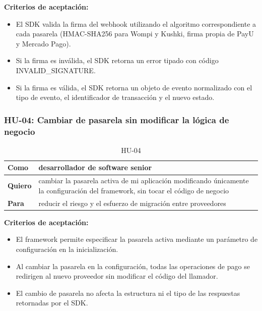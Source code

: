 \documentclass[10pt]{article}
\begin{document}
\textbf{Criterios de aceptación:}
\begin{itemize}
  \item El SDK valida la firma del webhook utilizando el algoritmo correspondiente a cada pasarela (HMAC-SHA256 para Wompi y Kushki, firma propia de PayU y Mercado Pago).
  \item Si la firma es inválida, el SDK retorna un error tipado con código INVALID\_SIGNATURE.
  \item Si la firma es válida, el SDK retorna un objeto de evento normalizado con el tipo de evento, el identificador de transacción y el nuevo estado.
\end{itemize}

\subsubsection{HU-04: Cambiar de pasarela sin modificar la lógica de negocio}
\begin{table}[htbp]
  \centering
  \renewcommand{\arraystretch}{1.2}
  \begin{tabularx}{\textwidth}{|l|X|}
    \hline
    \textbf{Como} & desarrollador de software senior \\
    \hline
    \textbf{Quiero} & cambiar la pasarela activa de mi aplicación modificando únicamente la configuración del framework, sin tocar el código de negocio \\
    \hline
    \textbf{Para} & reducir el riesgo y el esfuerzo de migración entre proveedores \\
    \hline
  \end{tabularx}
  \caption{HU-04}
  \label{tab:hu-04}
\end{table}

\textbf{Criterios de aceptación:}
\begin{itemize}
  \item El framework permite especificar la pasarela activa mediante un parámetro de configuración en la inicialización.
  \item Al cambiar la pasarela en la configuración, todas las operaciones de pago se redirigen al nuevo proveedor sin modificar el código del llamador.
  \item El cambio de pasarela no afecta la estructura ni el tipo de las respuestas retornadas por el SDK.
\end{itemize}
\end{document}
